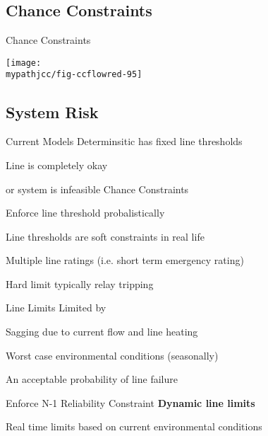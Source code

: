 \subsection{Chance Constraints}
\begin{frame}{Chance Constraints}

\begin{center}
\texttt{[image: \\mypathjcc/fig-ccflowred-95]}
\end{center}


\end{frame}

\subsection{System Risk}
\begin{frame}{Current Models}
Determinsitic has fixed line thresholds
\bi
\item Line is completely okay
\item or system is infeasible
\ei
\pause
Chance Constraints
\bi
\item Enforce line threshold probalistically
\ei
\pause

\alert{Line thresholds are soft constraints in real life}
\pause
\bi
\item Multiple line ratings (i.e. short term emergency rating)
\item Hard limit typically relay tripping
\ei
\end{frame}

\begin{frame}{Line Limits}
Limited by
\bi
\item Sagging due to current flow and line heating
\item \alert<2>{Worst case environmental conditions (seasonally)}
\item An acceptable probability of line failure
\item Enforce N-1 Reliability Constraint
\ei
\bigskip
\pause
\textbf{Dynamic line limits}
\bi
\item Real time limits based on current environmental conditions
\ei

\end{frame}

